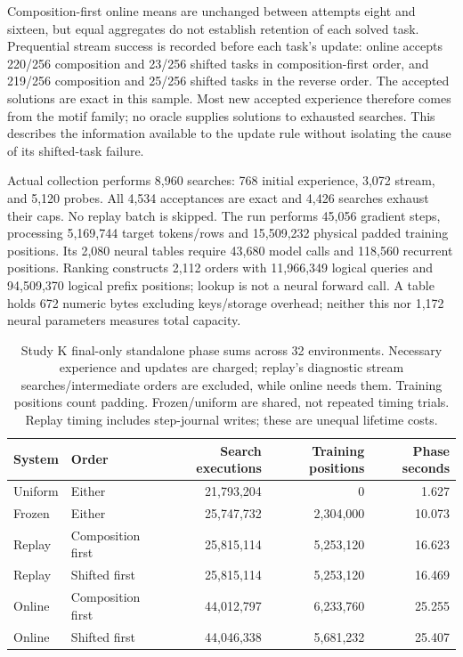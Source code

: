 \documentclass[11pt]{article}
\begin{document}
Composition-first online means are unchanged between attempts eight and
sixteen, but equal aggregates do not establish retention of each solved task.
Prequential stream success is recorded before each task's update: online
accepts 220/256 composition and 23/256 shifted tasks in composition-first
order, and 219/256 composition and 25/256 shifted tasks in the reverse order.
The accepted solutions are exact in this sample. Most new accepted
experience therefore comes from the motif family; no oracle supplies
solutions to exhausted searches. This describes the information available
to the update rule without isolating the cause of its shifted-task failure.

Actual collection performs 8,960 searches: 768 initial experience, 3,072 stream,
and 5,120 probes. All 4,534 acceptances are exact and 4,426 searches exhaust
their caps. No replay batch is skipped. The run performs 45,056 gradient
steps, processing 5,169,744 target tokens/rows and 15,509,232 physical padded
training positions. Its 2,080 neural tables require 43,680 model calls and
118,560 recurrent positions. Ranking constructs 2,112 orders with 11,966,349
logical queries and 94,509,370 logical prefix positions; lookup is not a
neural forward call. A table holds 672 numeric bytes excluding keys/storage
overhead; neither this nor 1,172 neural parameters measures total capacity.

\begin{table}[ht]
\centering\small
\begin{tabular}{llrrr}
\toprule
System & Order & Search executions & Training positions & Phase seconds \\
\midrule
Uniform & Either & 21,793,204 & 0 & 1.627 \\
Frozen & Either & 25,747,732 & 2,304,000 & 10.073 \\
Replay & Composition first & 25,815,114 & 5,253,120 & 16.623 \\
Replay & Shifted first & 25,815,114 & 5,253,120 & 16.469 \\
Online & Composition first & 44,012,797 & 6,233,760 & 25.255 \\
Online & Shifted first & 44,046,338 & 5,681,232 & 25.407 \\
\bottomrule
\end{tabular}
\caption{Study K final-only standalone phase sums across 32 environments.
 Necessary experience and updates are charged; replay's diagnostic stream
 searches/intermediate orders are excluded, while online needs them. Training
 positions count padding. Frozen/uniform are shared, not repeated timing trials.
 Replay timing includes step-journal writes; these are unequal lifetime costs.}
\label{tab:k-costs}
\end{table}
\end{document}
